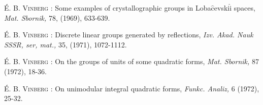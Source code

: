 \begin{thebibliography}{99}
 \textsc{\'E. B. Vinberg :} Some examples of crystallographic groups in Loba$\hat{\text{c}}$evski$\hat{\text{i}}$ spaces, \textit{Mat. Sbornik,} 78, (1969), 633-639.

 \textsc{\'E. B. Vinberg :} Discrete linear groups generated by reflections, \textit{Izv. Akad. Nauk SSSR, ser, mat., } 35, (1971), 1072-1112.

 \textsc{\'E. B. Vinberg :} On the groups of units of some quadratic forms, \textit{Mat. Sbornik,}  87 (1972), 18-36.

 \textsc{\'E. B. Vinberg :} On unimodular integral quadratic forms, \textit{Funkc. Analiz, } 6 (1972), 25-32.
\end{thebibliography}
